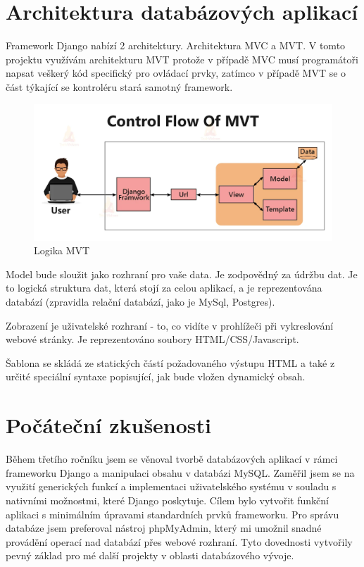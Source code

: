 \documentclass[12pt, a4paper,
twoside,        %
openright
]{report}
\begin{document}
\section{Architektura databázových aplikací}
\label{sec:architektura}
Framework Django nabízí 2 architektury. Architektura MVC a MVT. V tomto projektu využívám architekturu MVT protože v případě MVC musí programátoři napsat veškerý kód specifický pro ovládací prvky, zatímco v případě MVT se o část týkající se kontroléru stará samotný framework. 
\begin{figure}[h]
			\centering
			\includegraphics[width=1\linewidth]{image/mvt.png} 
			\caption{Logika MVT}
			\label{fig:mvc}
\end{figure}
\newpage
Model bude sloužit jako rozhraní pro vaše data. Je zodpovědný za údržbu dat. Je to logická struktura dat, která stojí za celou aplikací, a je reprezentována databází (zpravidla relační databází, jako je MySql, Postgres).

Zobrazení je uživatelské rozhraní - to, co vidíte v prohlížeči při vykreslování webové stránky. Je reprezentováno soubory HTML/CSS/Javascript.

Šablona se skládá ze statických částí požadovaného výstupu HTML a také z určité speciální syntaxe popisující, jak bude vložen dynamický obsah.
\section[Počáteční zkušenosti]{Počáteční zkušenosti}
Během třetího ročníku jsem se věnoval tvorbě databázových aplikací v rámci frameworku Django a manipulaci obsahu v databázi MySQL. Zaměřil jsem se na využití generických funkcí a implementaci uživatelského systému v souladu s nativními možnostmi, které Django poskytuje. Cílem bylo vytvořit funkční aplikaci s minimálním úpravami standardních prvků frameworku. Pro správu databáze jsem preferoval nástroj phpMyAdmin, který mi umožnil snadné provádění operací nad databází přes webové rozhraní. Tyto dovednosti vytvořily pevný základ pro mé další projekty v oblasti databázového vývoje.
\end{document}
